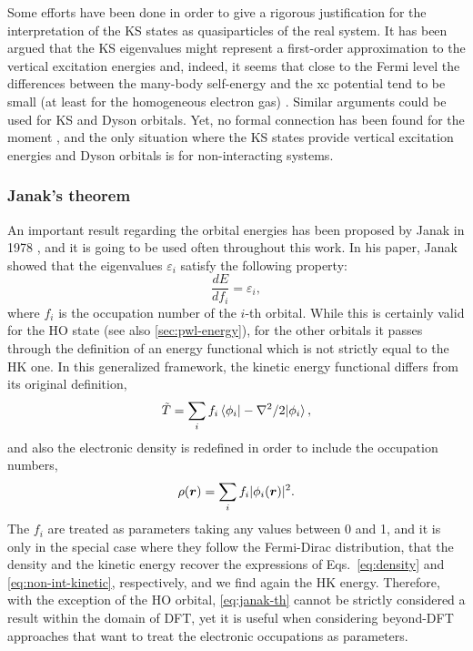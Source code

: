 Some efforts have been done in order to give a rigorous justification for the interpretation of the KS states as quasiparticles of the real system. It has been argued that the KS eigenvalues might represent a first-order approximation to the vertical excitation energies \cite{chong_interpretation_2002} and, indeed, it seems that close to the Fermi level the differences between the many-body self-energy and the xc potential tend to be small (at least for the homogeneous electron gas) \cite{jones_density_1989}. Similar arguments could be used for KS and Dyson orbitals. Yet, no formal connection has been found for the moment \cite{di_valentin_gas-phase_2014}, and the only situation where the KS states provide vertical excitation energies and Dyson orbitals is for non-interacting systems.

\subsubsection*{Janak's theorem}
An important result regarding the orbital energies has been proposed by Janak in 1978 \cite{janak_proof_1978}, and it is going to be used often throughout this work. In his paper, Janak showed that the eigenvalues $\varepsilon_i$ satisfy the following property:
%
\begin{equation}
    \frac{dE}{df_i} = \varepsilon_i ,
    \label{eq:janak-th}
\end{equation}
%
where $f_i$ is the occupation number of the $i$-th orbital. While this is certainly valid for the HO state (see also \cref{sec:pwl-energy}), for the other orbitals it passes through the definition of an energy functional which is not strictly equal to the HK one. In this generalized framework, the kinetic energy functional differs from its original definition,
%
\begin{equation}
    \Tilde{T} = \sum_i f_i \braket{\phi_i| -\nabla^2/2 |\phi_i} ,
    \label{eq:janak-kinetic}
\end{equation}
%
and also the electronic density is redefined in order to include the occupation numbers,
%
\begin{equation}
    \rho({\bm r}) = \sum_i f_i |\phi_i({\bm r})|^2 .
    \label{eq:janak-density}
\end{equation}
%
The $f_i$ are treated as parameters taking any values between 0 and 1, and it is only in the special case where they follow the Fermi-Dirac distribution, that the density and the kinetic energy recover the expressions of Eqs.~\eqref{eq:density} and \eqref{eq:non-int-kinetic}, respectively, and we find again the HK energy. Therefore, with the exception of the HO orbital, \cref{eq:janak-th} cannot be strictly considered a result within the domain of DFT, yet it is useful when considering beyond-DFT approaches that want to treat the electronic occupations as parameters.

